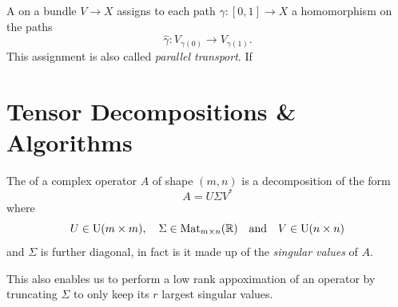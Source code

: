 \begin{definition}[Connection]
    A \emph{} on a bundle $V \longrightarrow X$ assigns to
    each path $\gamma : [0,1] \to X$ a homomorphism on the paths
    \[
        \hat{\gamma} : V_{\gamma(0)} \to V_{\gamma(1)}.
    \]
    This assignment is also called \emph{parallel transport}. If 
\end{definition}

\section{Tensor Decompositions \& Algorithms}

\begin{definition} The \emph{}
  of a complex operator $A$ of shape $(m,n)$ is a decomposition of the form
  \[
      A = U\Sigma V^\ast
  \]
  where
  \[
      U \in \mathrm{U}(m \times m), \quad \Sigma \in \mathrm{Mat}_{m  \times n}(\mathbb{R}) \quad \text{and} \quad V \in \mathrm{U}(n \times n)
  \]
  and $\Sigma$ is further diagonal, in fact is it made up of the
  \emph{singular values} of $A$.
  
  This also enables us to perform a low rank appoximation of an operator by
  truncating $\Sigma$ to only keep its $r$ largest singular values. 
\end{definition}
